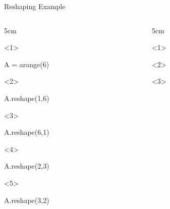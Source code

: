 \documentclass[hyperref={pdfpagelabels=false},table]{beamer}
\begin{document}
\begin{frame}[fragile]{Reshaping Example}
\begin{columns}
\begin{column}{5cm}
\begin{onlyenv}<1>
\begin{python}
A = arange(6)
\end{python}
\end{onlyenv}
\begin{onlyenv}<2>
\begin{python}
A.reshape(1,6)
\end{python}
\end{onlyenv}
\begin{onlyenv}<3>
\begin{python}
A.reshape(6,1)
\end{python}
\end{onlyenv}
\begin{onlyenv}<4>
\begin{python}
A.reshape(2,3)
\end{python}
\end{onlyenv}
\begin{onlyenv}<5>
\begin{python}
A.reshape(3,2)
\end{python}
\end{onlyenv}
\end{column}
\begin{column}{5cm}
\begin{onlyenv}<1>
\end{onlyenv}
\begin{onlyenv}<2>
\end{onlyenv}
\begin{onlyenv}<3>
\end{onlyenv}
\end{column}
\end{columns}
\end{frame}
\end{document}

